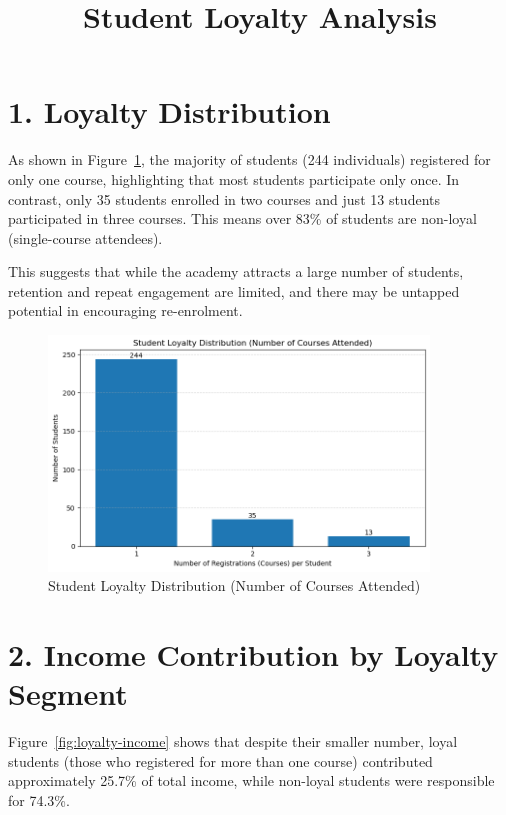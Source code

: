 \documentclass[12pt,a4paper]{article}
\title{Student Loyalty Analysis}
\date{}
\begin{document}
\maketitle

\section*{1. Loyalty Distribution}
As shown in Figure~\ref{fig:loyalty-distribution}, the majority of students (244 individuals) registered for only one course, highlighting that most students participate only once. In contrast, only 35 students enrolled in two courses and just 13 students participated in three courses. This means over 83\% of students are non-loyal (single-course attendees).

This suggests that while the academy attracts a large number of students, retention and repeat engagement are limited, and there may be untapped potential in encouraging re-enrolment.

\begin{figure}[h!]
    \centering
    \includegraphics[width=0.9\textwidth]{Student Loyalty Distribution (Number of Courses Attended).png}
    \caption{Student Loyalty Distribution (Number of Courses Attended)}
    \label{fig:loyalty-distribution}
\end{figure}

\section*{2. Income Contribution by Loyalty Segment}
Figure~\ref{fig:loyalty-income} shows that despite their smaller number, loyal students (those who registered for more than one course) contributed approximately 25.7\% of total income, while non-loyal students were responsible for 74.3\%.
\end{document}
